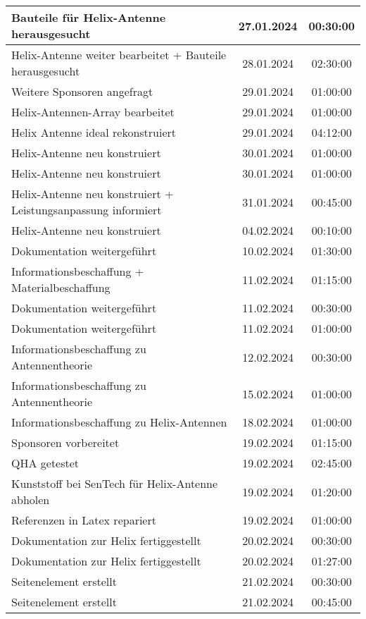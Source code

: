 \begin{longtable}{|l|c|c|}
	\hline
	Bauteile für Helix-Antenne herausgesucht & 27.01.2024 & 00:30:00 \\
	\hline
	Helix-Antenne weiter bearbeitet + Bauteile herausgesucht & 28.01.2024 & 02:30:00 \\
	\hline
	Weitere Sponsoren angefragt & 29.01.2024 & 01:00:00 \\
	\hline
	Helix-Antennen-Array bearbeitet & 29.01.2024 & 01:00:00 \\
	\hline
	Helix Antenne ideal rekonstruiert & 29.01.2024 & 04:12:00 \\
	\hline
	Helix-Antenne neu konstruiert & 30.01.2024 & 01:00:00 \\
	\hline
	Helix-Antenne neu konstruiert & 30.01.2024 & 01:00:00 \\
	\hline
	Helix-Antenne neu konstruiert + Leistungsanpassung informiert & 31.01.2024 & 00:45:00 \\
	\hline
	Helix-Antenne neu konstruiert & 04.02.2024 & 00:10:00 \\
	\hline
	Dokumentation weitergeführt & 10.02.2024 & 01:30:00 \\
	\hline
	Informationsbeschaffung + Materialbeschaffung & 11.02.2024 & 01:15:00 \\
	\hline
	Dokumentation weitergeführt & 11.02.2024 & 00:30:00 \\
	\hline
	Dokumentation weitergeführt & 11.02.2024 & 01:00:00 \\
	\hline
	Informationsbeschaffung zu Antennentheorie & 12.02.2024 & 00:30:00 \\
	\hline
	Informationsbeschaffung zu Antennentheorie & 15.02.2024 & 01:00:00 \\
	\hline
	Informationsbeschaffung zu Helix-Antennen & 18.02.2024 & 01:00:00 \\
	\hline
	Sponsoren vorbereitet & 19.02.2024 & 01:15:00 \\
	\hline
	QHA getestet & 19.02.2024 & 02:45:00 \\
	\hline
	Kunststoff bei SenTech für Helix-Antenne abholen & 19.02.2024 & 01:20:00 \\
	\hline
	Referenzen in Latex repariert & 19.02.2024 & 01:00:00 \\
	\hline
	Dokumentation zur Helix fertiggestellt & 20.02.2024 & 00:30:00 \\
	\hline
	Dokumentation zur Helix fertiggestellt & 20.02.2024 & 01:27:00 \\
	\hline
	Seitenelement erstellt & 21.02.2024 & 00:30:00 \\
	\hline
	Seitenelement erstellt & 21.02.2024 & 00:45:00 \\

\end{longtable}
